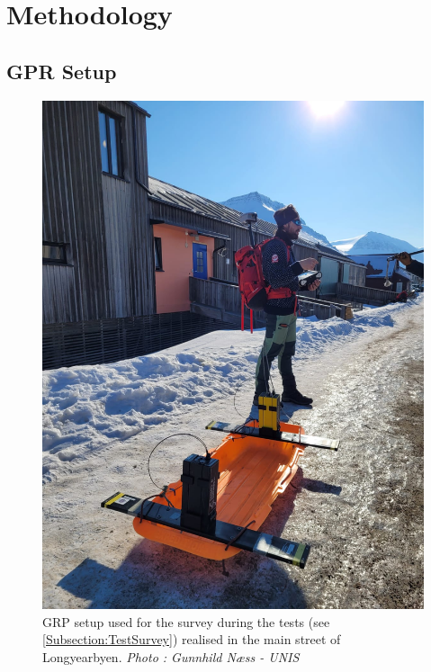 \newpage
\section{Methodology} \label{Section:Methodology}


\subsection{GPR Setup}

\begin{figure}
    \includegraphics[width=\linewidth]{Images/00_Methodology/PictureGunnhild.jpg}
    \caption{GRP setup used for the survey during the tests (see \ref{Subsection:TestSurvey}) realised in the main street of Longyearbyen. \emph{Photo : Gunnhild Næss - UNIS}}
    \label{fig:PictureGunnhild}
\end{figure}

